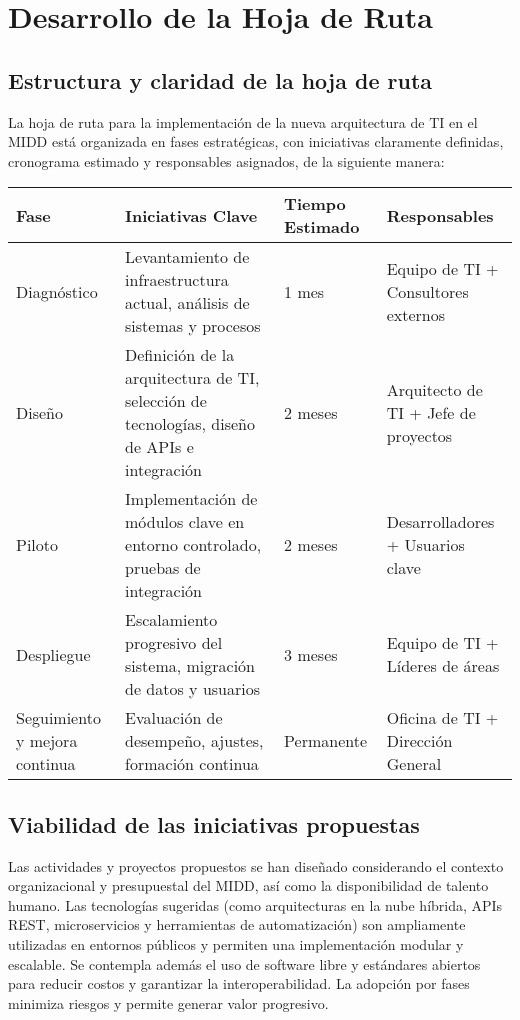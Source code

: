 \section{Desarrollo de la Hoja de Ruta}

\subsection{Estructura y claridad de la hoja de ruta}

La hoja de ruta para la implementación de la nueva arquitectura de TI en el MIDD está organizada en fases estratégicas, con iniciativas claramente definidas, cronograma estimado y responsables asignados, de la siguiente manera:

\begin{center}
\begin{tabular}{|p{3cm}|p{5cm}|p{3cm}|p{3cm}|}
\hline
\textbf{Fase} & \textbf{Iniciativas Clave} & \textbf{Tiempo Estimado} & \textbf{Responsables} \\
\hline
Diagnóstico & Levantamiento de infraestructura actual, análisis de sistemas y procesos & 1 mes & Equipo de TI + Consultores externos \\
\hline
Diseño & Definición de la arquitectura de TI, selección de tecnologías, diseño de APIs e integración & 2 meses & Arquitecto de TI + Jefe de proyectos \\
\hline
Piloto & Implementación de módulos clave en entorno controlado, pruebas de integración & 2 meses & Desarrolladores + Usuarios clave \\
\hline
Despliegue & Escalamiento progresivo del sistema, migración de datos y usuarios & 3 meses & Equipo de TI + Líderes de áreas \\
\hline
Seguimiento y mejora continua & Evaluación de desempeño, ajustes, formación continua & Permanente & Oficina de TI + Dirección General \\
\hline
\end{tabular}
\end{center}

\vspace{1em}

\subsection{Viabilidad de las iniciativas propuestas}

Las actividades y proyectos propuestos se han diseñado considerando el contexto organizacional y presupuestal del MIDD, así como la disponibilidad de talento humano. Las tecnologías sugeridas (como arquitecturas en la nube híbrida, APIs REST, microservicios y herramientas de automatización) son ampliamente utilizadas en entornos públicos y permiten una implementación modular y escalable. Se contempla además el uso de software libre y estándares abiertos para reducir costos y garantizar la interoperabilidad. La adopción por fases minimiza riesgos y permite generar valor progresivo.

